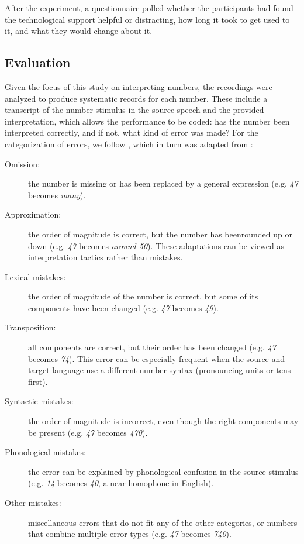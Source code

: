 \documentclass[output=paper]{langsci/langscibook}
\begin{document}
After the experiment, a questionnaire polled whether the participants had found the technological support helpful or distracting, how long it took to get used to it, and what they would change about it.

\subsection{Evaluation}
Given the focus of this study on interpreting numbers, the recordings were analyzed to produce systematic records for each number. These include a transcript of the number stimulus in the source speech and the provided interpretation, which allows the performance to be coded: has the number been interpreted correctly, and if not, what kind of error was made? For the categorization of errors, we follow \citet{Pinochi2009}, which in turn was adapted from \citet{Braun1996}:

\begin{description}
\item[Omission:] the number is missing or has been replaced by a general expression (e.g. \textit{47} becomes \textit{many}).
\item[Approximation:] the order of magnitude is correct, but the number has been\linebreak rounded up or down (e.g. \textit{47} becomes \textit{around 50}). These adaptations can be viewed as interpretation tactics rather than mistakes.
\item[Lexical mistakes:] the order of magnitude of the number is correct, but some of its components have been changed (e.g. \textit{47} becomes \textit{49}).
\item[Transposition:] all components are correct, but their order has been changed (e.g. \textit{47} becomes \textit{74}). This error can be especially frequent when the source and target language use a different number syntax (pronouncing units or tens first).
\item[Syntactic mistakes:] the order of magnitude is incorrect, even though the right components may be present (e.g. \textit{47} becomes \textit{470}).
\item[Phonological mistakes:] the error can be explained by phonological confusion in the source stimulus (e.g. \textit{14} becomes \textit{40}, a near-homophone in English).
\item[Other mistakes:] miscellaneous errors that do not fit any of the other categories, or numbers that combine multiple error types (e.g. \textit{47} becomes \textit{740}).
\end{description}
\end{document}
